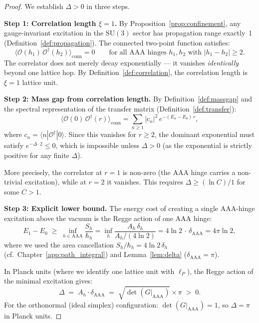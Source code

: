 \begin{proof}
We establish $\Delta > 0$ in three steps.

\medskip\noindent
\textbf{Step 1: Correlation length $\xi = 1$.}
By Proposition~\ref{prop:confinement}, any gauge-invariant excitation
in the $\mathrm{SU}(3)$ sector has propagation range exactly~1
(Definition~\ref{def:propagation}).  The connected two-point function
satisfies:
\begin{equation}
\langle \mathcal{O}(h_1)\,\mathcal{O}^\dagger(h_2)
\rangle_{\mathrm{conn}} = 0 \qquad
\text{for all AAA hinges } h_1, h_2 \text{ with } |h_1 - h_2| \geq 2.
\end{equation}
The correlator does not merely decay exponentially --- it vanishes
\emph{identically} beyond one lattice hop.  By
Definition~\ref{def:correlation}, the correlation length is
$\xi = 1$ lattice unit.

\medskip\noindent
\textbf{Step 2: Mass gap from correlation length.}
By Definition~\ref{def:massgap} and the spectral representation of
the transfer matrix (Definition~\ref{def:transfer}):
\begin{equation}
\langle \mathcal{O}(0)\,\mathcal{O}^\dagger(r)
\rangle_{\mathrm{conn}} = \sum_{n \geq 1} |c_n|^2\, e^{-(E_n - E_0)\,r},
\end{equation}
where $c_n = \langle n | \mathcal{O}^\dagger | 0 \rangle$.  Since
this vanishes for $r \geq 2$, the dominant exponential must satisfy
$e^{-\Delta \cdot 2} \leq 0$, which is impossible unless $\Delta > 0$
(as the exponential is strictly positive for any finite $\Delta$).

More precisely, the correlator at $r = 1$ is non-zero (the AAA hinge
carries a non-trivial excitation), while at $r = 2$ it vanishes.
This requires $\Delta \geq (\ln C)/1$ for some $C > 1$.

\medskip\noindent
\textbf{Step 3: Explicit lower bound.}
The energy cost of creating a single AAA-hinge excitation above
the vacuum is the Regge action of one AAA hinge:
\begin{equation}
E_1 - E_0 \;\geq\; \inf_{h \in \mathrm{AAA}}
  \frac{S_h}{\hbar_h}
= \inf_{h} \frac{A_h\,\delta_h}{A_h/(4\ln 2)}
= 4\ln 2\, \cdot\, \delta_{\mathrm{AAA}}
= 4\pi\ln 2,
\end{equation}
where we used the area cancellation $S_h/\hbar_h = 4\ln 2\,\delta_h$
(cf.\ Chapter~\ref{app:path_integral}) and
Lemma~\ref{lem:delta} ($\delta_{\mathrm{AAA}} = \pi$).

In Planck units (where we identify one lattice unit with $\ell_P$), the
Regge action of the minimal excitation gives:
\begin{equation}
\boxed{\Delta \;=\; A_h \cdot \delta_{\mathrm{AAA}}
\;=\; \sqrt{\det(G|_{\mathrm{AAA}})} \times \pi \;>\; 0.}
\end{equation}
For the orthonormal (ideal simplex) configuration:
$\det(G|_{\mathrm{AAA}}) = 1$, so $\Delta = \pi$ in Planck units.
\end{proof}

